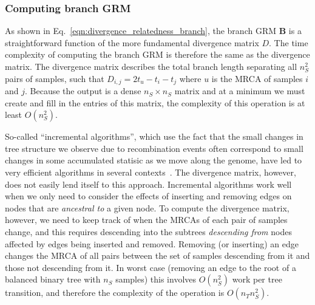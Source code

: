 \subsubsection{Computing branch GRM}

As shown in Eq.~\eqref{eqn:divergence_relatedness_branch},
the branch GRM $\mathbf{B}$ is a 
straightforward function of the more fundamental divergence matrix $D$.
The time complexity of computing the branch GRM is therefore the same as 
the divergence matrix.
The divergence matrix describes
the total branch length separating all $n_S^2$ pairs of samples, such 
that $D_{i,j} = 2t_u - t_i - t_j$ where $u$ is the MRCA of samples $i$ and $j$.
Because the output is a dense $n_S \times n_S$ matrix 
and at a minimum we must create and fill in the entries of this matrix,
the complexity of this operation is at least $O(n_S^2)$.

So-called ``incremental algorithms'', which use the fact that the 
small changes in tree structure we observe due to recombination events
often correspond to small changes in some accumulated statisic as 
we move along the genome,
have led to very efficient algorithms in several 
contexts~\citep{kelleher2016efficient,ralph2020efficiently,kelleher2020coalescent}. 
The divergence matrix, however, does not easily lend itself to this approach.
Incremental algorithms work well when we only need to consider the effects 
of inserting and removing edges on nodes that are \emph{ancestral to}
a given node. To compute the divergence matrix, however, we need to keep track
of when the MRCAs of each pair of samples change, and this requires 
descending into the subtrees \emph{descending from} nodes affected by 
edges being inserted and removed. Removing (or inserting) an edge changes the MRCA of 
all pairs between the set of samples descending from it 
and those not descending from it. In worst case (removing an edge to the 
root of a balanced binary tree with $n_S$ samples) this involves 
$O(n_S^2)$ work per tree transition, and therefore the complexity of the 
operation is $O(n_T n_S^2)$. 

